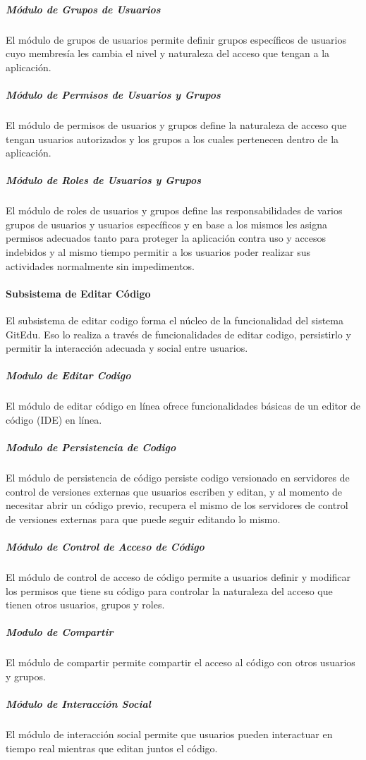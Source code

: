 \subparagraph{Módulo de Grupos de Usuarios}
El módulo de grupos de usuarios permite definir grupos específicos de usuarios cuyo membresía les cambia el nivel y naturaleza del acceso que tengan a la aplicación.

\subparagraph{Módulo de Permisos de Usuarios y Grupos}
El módulo de permisos de usuarios y grupos define la naturaleza de acceso que tengan usuarios autorizados y los grupos a los cuales pertenecen dentro de la aplicación.

\subparagraph{Módulo de Roles de Usuarios y Grupos}
El módulo de roles de usuarios y grupos define las responsabilidades de varios grupos de usuarios y usuarios específicos y en base a los mismos les asigna permisos adecuados tanto para proteger la aplicación contra uso y accesos indebidos y al mismo tiempo permitir a los usuarios poder realizar sus actividades normalmente sin impedimentos.

\paragraph{Subsistema de Editar Código}
El subsistema de editar codigo forma el núcleo de la funcionalidad del sistema GitEdu. Eso lo realiza a través de funcionalidades de editar codigo, persistirlo y permitir la interacción adecuada y social entre usuarios.

\subparagraph{Modulo de Editar Codigo}
El módulo de editar código en línea ofrece funcionalidades básicas de un editor de código (IDE) en línea.

\subparagraph{Modulo de Persistencia de Codigo}
El módulo de persistencia de código persiste codigo versionado en servidores de control de versiones externas que usuarios escriben y editan, y al momento de necesitar abrir un código previo, recupera el mismo de los servidores de control de versiones externas para que puede seguir editando lo mismo.

\subparagraph{Módulo de Control de Acceso de Código}
El módulo de control de acceso de código permite a usuarios definir y modificar los permisos que tiene su código para controlar la naturaleza del acceso que tienen otros usuarios, grupos y roles.

\subparagraph{Modulo de Compartir}
El módulo de compartir permite compartir el acceso al código con otros usuarios y grupos.

\subparagraph{Módulo de Interacción Social}
El módulo de interacción social permite que usuarios pueden interactuar en tiempo real mientras que editan juntos el código.

